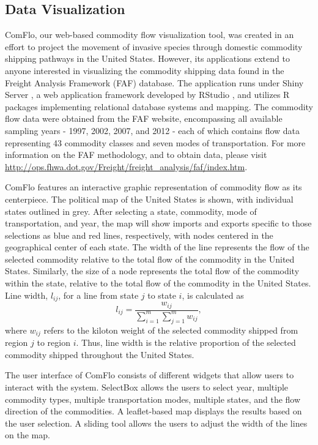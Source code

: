 \documentclass[12pt]{article}
\begin{document}
\subsection*{Data Visualization}

ComFlo, our web-based commodity flow visualization tool, was created in an effort to project the movement of invasive species through domestic commodity shipping pathways in the United States. However, its applications extend to anyone interested in visualizing the commodity shipping data found in the Freight Analysis Framework (FAF) database.  The application runs under Shiny Server \citep{Shiny}, a web application framework developed by RStudio \citep{Rstudio}, and utilizes R packages implementing relational database systems and mapping.  The commodity flow data were obtained from the FAF website, encompassing all available sampling years - 1997, 2002, 2007, and 2012 - each of which contains flow data representing 43 commodity classes and seven modes of transportation.  For more information on the FAF methodology, and to obtain data, please visit \url{http://ops.fhwa.dot.gov/Freight/freight_analysis/faf/index.htm}.

ComFlo features an interactive graphic representation of commodity flow as its centerpiece. The political map of the United States is shown, with individual states outlined in grey.  After selecting a state, commodity, mode of transportation, and year, the map will show imports and exports specific to those selections as blue and red lines, respectively, with nodes centered in the geographical center of each state.  The width of the line represents the flow of the selected commodity relative to the total flow of the commodity in the United States. Similarly, the size of a node represents the total flow of the commodity within the state, relative to the total flow of the commodity in the United States. Line width, $l_{ij}$, for a line from state $j$ to state $i$, is calculated as
\[
l_{ij} = \frac{w_{ij}}{\sum_{i=1}^{m}\sum_{j=1}^{m}w_{ij}}, 
\]
where $w_{ij}$ refers to the kiloton weight of the selected commodity shipped from region $j$ to region $i$.  Thus, line width is the relative proportion of the selected commodity shipped throughout the United States.

The user interface of ComFlo consists of different widgets that allow users to interact with the system. SelectBox allows the users to select year, multiple commodity types, multiple transportation modes, multiple states, and the flow direction of the commodities.  A leaflet-based map displays the results based on the user selection. A sliding tool allows the users to adjust the width of the lines on the map.  
\end{document}
